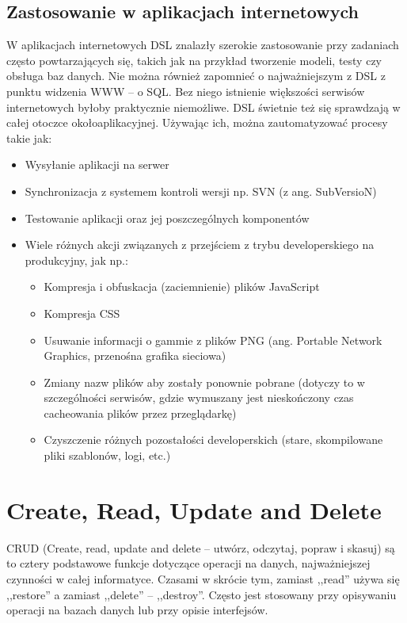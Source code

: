 \documentclass[a4paper,12pt,oneside]{report}
\begin{document}
\subsection{Zastosowanie w aplikacjach internetowych}
\label{dsl:web}
W aplikacjach internetowych DSL znalazły szerokie zastosowanie przy zadaniach często powtarzających się, takich jak na przykład tworzenie modeli, testy czy obsługa baz danych. Nie można również zapomnieć o najważniejszym z DSL z punktu widzenia WWW -- o SQL. Bez niego istnienie większości serwisów internetowych byłoby praktycznie niemożliwe. DSL świetnie też się sprawdzają w całej otoczce okołoaplikacyjnej. Używając ich, można zautomatyzować procesy takie jak:
\begin{itemize}
  \item Wysyłanie aplikacji na serwer
  \item Synchronizacja z systemem kontroli wersji np. SVN (z ang. SubVersioN)
  \item Testowanie aplikacji oraz jej poszczególnych komponentów
  \item Wiele różnych akcji związanych z przejściem z trybu developerskiego na produkcyjny, jak np.:
  \begin{itemize}
    \item Kompresja i obfuskacja (zaciemnienie) plików JavaScript
    \item Kompresja CSS
    \item Usuwanie informacji o gammie z plików PNG (ang. Portable Network Graphics, przenośna grafika sieciowa)
    \item Zmiany nazw plików aby zostały ponownie pobrane (dotyczy to w szczególności serwisów, gdzie wymuszany jest nieskończony czas cacheowania plików przez przeglądarkę)
    \item Czyszczenie różnych pozostałości developerskich (stare, skompilowane pliki szablonów, logi, etc.)
  \end{itemize}
\end{itemize}

\section{Create, Read, Update and Delete}
\label{sec:crud}
CRUD (Create, read, update and delete -- utwórz, odczytaj, popraw i skasuj) są to cztery podstawowe funkcje dotyczące operacji na danych, najważniejszej czynności w całej informatyce. Czasami w skrócie tym, zamiast ,,read'' używa się ,,restore'' a zamiast ,,delete'' -- ,,destroy''. Często jest stosowany przy opisywaniu operacji na bazach danych lub przy opisie interfejsów.
\end{document}
